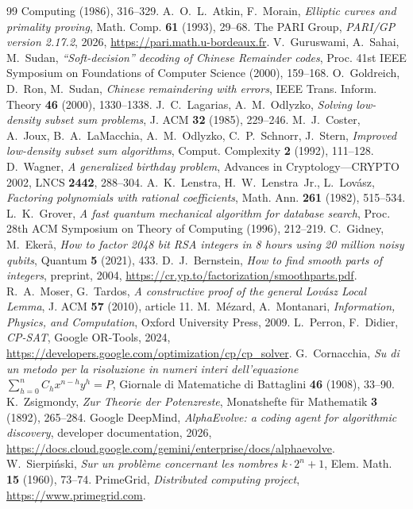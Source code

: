 \documentclass[11pt,oneside]{book}
\theoremstyle{plain}
\theoremstyle{definition}
\theoremstyle{remark}
\begin{document}
\begin{thebibliography}{99}
Computing (1986), 316--329.
 A.~O.~L.~Atkin, F.~Morain, \emph{Elliptic curves and
primality proving}, Math. Comp. \textbf{61} (1993), 29--68.
 The PARI Group, \emph{PARI/GP version 2.17.2}, 2026,
\url{https://pari.math.u-bordeaux.fr}.
 V.~Guruswami, A.~Sahai, M.~Sudan, \emph{``Soft-decision'' decoding
of Chinese Remainder codes}, Proc. 41st IEEE Symposium on Foundations of
Computer Science (2000), 159--168.
 O.~Goldreich, D.~Ron, M.~Sudan, \emph{Chinese remaindering
with errors}, IEEE Trans. Inform. Theory \textbf{46} (2000), 1330--1338.
 J.~C.~Lagarias, A.~M.~Odlyzko, \emph{Solving
low-density subset sum problems}, J. ACM \textbf{32} (1985), 229--246.
 M.~J.~Coster, A.~Joux, B.~A.~LaMacchia, A.~M.~Odlyzko,
C.~P.~Schnorr, J.~Stern, \emph{Improved low-density subset sum algorithms},
Comput. Complexity \textbf{2} (1992), 111--128.
 D.~Wagner, \emph{A generalized birthday problem}, Advances in
Cryptology---CRYPTO 2002, LNCS \textbf{2442}, 288--304.
 A.~K.~Lenstra, H.~W.~Lenstra~Jr., L.~Lov\'asz, \emph{Factoring
polynomials with rational coefficients}, Math. Ann. \textbf{261} (1982),
515--534.
 L.~K.~Grover, \emph{A fast quantum mechanical algorithm for
database search}, Proc. 28th ACM Symposium on Theory of Computing (1996),
212--219.
 C.~Gidney, M.~Eker\aa, \emph{How to factor 2048 bit RSA
integers in 8 hours using 20 million noisy qubits}, Quantum \textbf{5} (2021),
433.
 D.~J.~Bernstein, \emph{How to find smooth parts of
integers}, preprint, 2004, \url{https://cr.yp.to/factorization/smoothparts.pdf}.
 R.~A.~Moser, G.~Tardos, \emph{A constructive proof of the
general Lov\'asz Local Lemma}, J. ACM \textbf{57} (2010), article 11.
 M.~M\'ezard, A.~Montanari, \emph{Information, Physics,
and Computation}, Oxford University Press, 2009.
 L.~Perron, F.~Didier, \emph{CP-SAT}, Google OR-Tools, 2024,
\url{https://developers.google.com/optimization/cp/cp_solver}.
 G.~Cornacchia, \emph{Su di un metodo per la risoluzione in
numeri interi dell'equazione $\sum_{h=0}^{n}C_hx^{n-h}y^h=P$}, Giornale di
Matematiche di Battaglini \textbf{46} (1908), 33--90.
 K.~Zsigmondy, \emph{Zur Theorie der Potenzreste},
Monatshefte f\"ur Mathematik \textbf{3} (1892), 265--284.
 Google DeepMind, \emph{AlphaEvolve: a coding agent for
algorithmic discovery}, developer documentation, 2026,
\url{https://docs.cloud.google.com/gemini/enterprise/docs/alphaevolve}.
 W.~Sierpi\'nski, \emph{Sur un probl\`eme concernant les
nombres $k\cdot2^n+1$}, Elem. Math. \textbf{15} (1960), 73--74.
 PrimeGrid, \emph{Distributed computing project},
\url{https://www.primegrid.com}.
\end{thebibliography}
\end{document}
